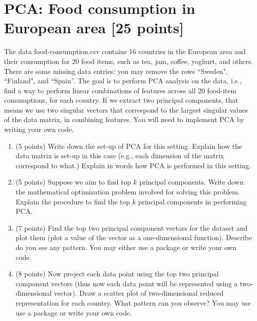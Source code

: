 \documentclass[twoside,10pt]{article}
\begin{document}
\section{PCA: Food consumption in European area [25 points]}

The data \textsf{food-consumption.csv} contains 16 countries in the European area and their consumption for 20 food items, such as tea, jam, coffee, yoghurt, and others. There are some missing data entries: you may remove the rows ``Sweden", ``Finland", and ``Spain''. The goal is to perform PCA analysis on the data, i.e., find a way to perform linear combinations of features across all 20 food-item consumptions, for each country. If we extract two principal components, that means we use two singular vectors that correspond to the largest singular values of the data matrix, in combining features. You will need to implement PCA by writing your own code.
\begin{enumerate}
\item (5 points) Write down the set-up of PCA for this setting. Explain how the data matrix is set-up in this case (e.g., each dimension of the matrix correspond to what.) Explain in words how PCA is performed in this setting. 
\item (5 points) Suppose we aim to find top $k$ principal components. Write down the mathematical optimization problem involved for solving this problem. Explain the procedure to find the top $k$ principal components in performing PCA. 
\item (7 points) Find the top two principal component vectors for the dataset and plot them (plot a value of the vector as a one-dimensional function). Describe do you see any pattern. You may either use a package or write your own code. 
\item (8 points) Now project each data point using the top two principal component vectors (thus now each data point will be represented using a two-dimensional vector). Draw a scatter plot of two-dimensional reduced representation for each country. What pattern can you observe? You may use use a package or write your own code. 
\end{enumerate}
\end{document}
